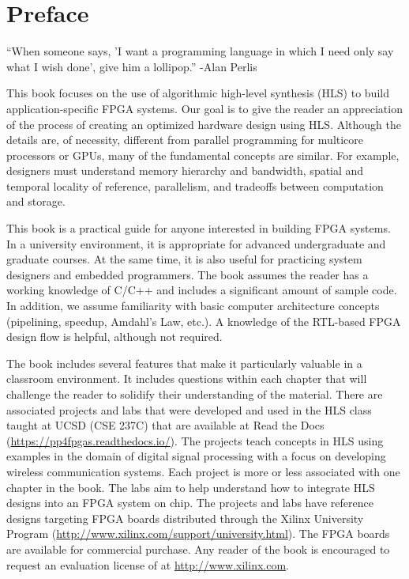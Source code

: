 
\chapter*{Preface}
\begin{aside}
``When someone says, 'I want a programming language in which I need only say what I wish done', give him a lollipop.'' -Alan Perlis
\end{aside}

This book focuses on the use of algorithmic high-level synthesis (HLS) to build application-specific FPGA systems.  Our goal is to give the reader an appreciation of the process of creating an optimized hardware design using HLS. Although the details are, of necessity, different from parallel programming for multicore processors or GPUs, many of the fundamental concepts are similar.  For example, designers must understand memory hierarchy and bandwidth, spatial and temporal locality of reference, parallelism, and tradeoffs between computation and storage.

This book is a practical guide for anyone interested in building FPGA systems.  In a university environment, it is appropriate for advanced undergraduate and graduate courses.  At the same time, it is also useful for practicing system designers and embedded programmers.  The book assumes the reader has a working knowledge of C/C++ and includes a significant amount of sample code. In addition, we assume familiarity with basic computer architecture concepts (pipelining, speedup, Amdahl's Law, etc.).  A knowledge of the RTL-based FPGA design flow is helpful, although not required.

The book includes several features that make it particularly valuable in a classroom environment.  It includes questions within each chapter that will challenge the reader to solidify their understanding of the material.  There are associated projects and labs that were developed and used in the HLS class taught at UCSD (CSE 237C) that are available at Read the Docs (\url{https://pp4fpgas.readthedocs.io/}). The projects teach concepts in HLS using examples in the domain of digital signal processing with a focus on developing wireless communication systems.  Each project is more or less associated with one chapter in the book. The labs aim to help understand how to integrate HLS designs into an FPGA system on chip. The projects and labs have reference designs targeting FPGA boards distributed through the Xilinx University Program (\url{http://www.xilinx.com/support/university.html}).   The FPGA boards are available for commercial purchase.  Any reader of the book is encouraged to request an evaluation license of \VHLS at \url{http://www.xilinx.com}.

